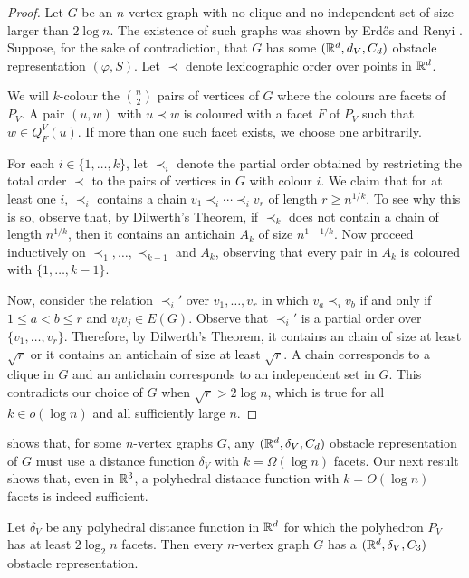 \documentclass{patmorin}
\begin{document}
\begin{proof}
  Let $G$ be an $n$-vertex graph with no clique and no independent set of
  size larger than $2\log n$. The existence of such graphs was shown by
  Erd\H{o}s and Renyi \cite{X}. Suppose, for the sake of contradiction,
  that $G$ has some $(\mathbb{R}^d, d_{V}, C_d)$ obstacle representation
  $(\varphi,S)$. Let $\prec$ denote lexicographic order over points
  in $\mathbb{R}^{d}$.

  We will $k$-colour the $\binom{n}{2}$ pairs of vertices of $G$ where
  the colours are facets of $P_V$.  A pair $(u,w)$ with $u\prec w$
  is coloured with a facet $F$ of $P_V$ such that $w\in Q^V_F(u)$.
  If more than one such facet exists, we choose one arbitrarily.

  For each $i\in\{1,\ldots,k\}$, let $\prec_i$ denote the partial
  order obtained by restricting the total order $\prec$ to the pairs of
  vertices in $G$ with colour $i$.  We claim that for at least one $i$,
  $\prec_i$ contains a chain $v_1\prec_i\cdots\prec_i v_r$ of length
  $r\ge n^{1/k}$.  To see why this is so, observe that, by Dilwerth's
  Theorem, if $\prec_k$ does not contain a chain of length $n^{1/k}$,
  then it contains an antichain $A_k$ of size $n^{1-1/k}$.  Now proceed
  inductively on $\prec_1,\ldots,\prec_{k-1}$ and $A_k$, observing that
  every pair in $A_k$ is coloured with $\{1,\ldots,k-1\}$.

  Now, consider the relation $\prec_i'$ over $v_1,\ldots,v_r$ in which
  $v_a\prec_i v_b$ if and only if $1\le a<b\le r$ and $v_iv_j\in E(G)$.
  Observe that $\prec_i'$ is a partial order over $\{v_1,\ldots,v_r\}$.
  Therefore, by Dilwerth's Theorem, it contains an chain of size at least
  $\sqrt{r}$ or it contains an antichain of size at least $\sqrt{r}$.
  A chain corresponds to a clique in $G$ and an antichain corresponds
  to an independent set in $G$.  This contradicts our choice of $G$
  when $\sqrt{r} > 2\log n$, which is true for all $k\in o(\log n)$
  and all sufficiently large $n$.
\end{proof}


 shows that, for some $n$-vertex graphs $G$,
any $(\mathbb{R}^d, \delta_{V}, C_d)$ obstacle representation of $G$
must use a distance function $\delta_{V}$ with $k=\Omega(\log
n)$ facets.  Our next result shows that, even in $\mathbb{R}^3$, a polyhedral
distance function with $k=O(\log n)$ facets is indeed sufficient.

\begin{thm}
   Let $\delta_{V}$ be any polyhedral distance function in $\mathbb{R}^d$ for
   which the polyhedron $P_{V}$ has at least $2\log_2 n$ facets.  
   Then every $n$-vertex graph $G$
   has a $(\mathbb{R}^d,\delta_{V},C_3)$ obstacle representation.
\end{thm}
\end{document}

